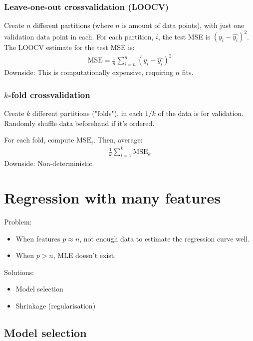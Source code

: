 \documentclass{article}
\begin{document}
\subsubsection{Leave-one-out crossvalidation (LOOCV)}

Create $n$ different partitions (where $n$ is amount of data points), with just one validation data point in each.
For each partition, $i$, the test MSE is $(y_i-\hat{y_i})^2$.
The LOOCV estimate for the test MSE is:
\begin{align*}
    \text{MSE} = \frac{1}{n}\sum_{i=n}^{n}(y_i-\hat{y_i})^2
\end{align*}
Downside: This is computationally expensive, requiring $n$ fits.

\subsubsection{$k$-fold crossvalidation}

Create $k$ different partitions ("folds"), in each $1/k$ of the data is for validation. Randomly shuffle data beforehand if it's ordered.

For each fold, compute $\text{MSE}_i$. Then, average:
\begin{align*}
    \frac{1}{k}\sum_{i=1}^{k}\text{MSE}_k
\end{align*}
Downside: Non-deterministic.

\section{Regression with many features}

Problem:
\begin{itemize}
    \item When features $p \approx n$, not enough data to estimate the regression curve well.
    \item When $p > n$, MLE doesn't exist.
\end{itemize}

Solutions:
\begin{itemize}
    \item Model selection
    \item Shrinkage (regularisation)
\end{itemize}

\subsection{Model selection}
\end{document}
